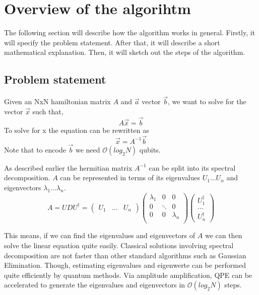 \section{ Overview of the algorihtm }
The following section will describe how the algorithm works in general.
Firstly, it will specify the problem statement. 
After that, it will describe a short mathematical explanation. 
Then, it will sketch out the steps of the algorithm.

\subsection{Problem statement}

Given an NxN hamiltonian matrix $A$ and $\vec a$ vector $\vec b$, we want to solve for the vector $\vec x$ such that,
\begin{equation}
A \vec{x} = \vec{b}
\end{equation}
To solve for x the equation can be rewritten as
\begin{equation}
\vec{x} = A^{-1}\vec{b}
\end{equation}
Note that to encode $\vec b$ we need $\mathcal{O}(log_2 N)$ qubits.

As described earlier the hermitian matrix $A^{-1}$ can be split into its spectral decomposition. 
$A$ can be represented in terms of its eigenvalues $U_1 ... U_n$ and eigenvectors $\lambda_1 ... \lambda_n$.
\begin{equation} 
A =  U D U^{\dagger} = \begin{pmatrix} U_1 & ...& U_n \end{pmatrix} \begin{pmatrix} \lambda_1 & 0 & 0 \\  0 & \ddots & 0\\ 0 & 0& \lambda_n \\ \end{pmatrix} \begin{pmatrix} U^\dagger_1 \\ ...\\ U^\dagger_n \end{pmatrix}
\end{equation}

This means, if we can find the eigenvalues and eigenvectors of $A$ we can then solve the linear equation quite easily. 
Classical solutions involving spectral decomposition are not faster than other standard algorithms such as Gaussian Elimination. 
Though, estimating eigenvalues and eigenwerte can be performed quite efficiently by quantum methods.
Via amplitude amplification, QPE can be accelerated to generate the eigenvalues and eigenvectors in $\mathcal{O}(log_2 N)$ steps.


